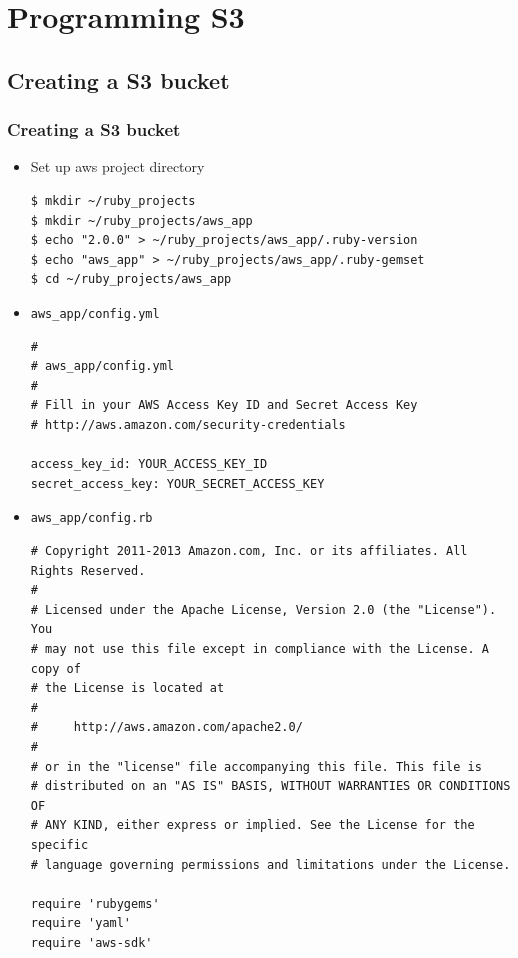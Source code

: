 \documentclass{beamer}
\begin{document}
\section{Programming S3}
\subsection{Creating a S3 bucket}
\begin{frame}
\frametitle{Creating a S3 bucket}
\begin{itemize}

\item Set up aws project directory
\lstset{language=shell, escapechar=!}
\begin{lstlisting}[escapechar=!]
$ mkdir ~/ruby_projects
$ mkdir ~/ruby_projects/aws_app
$ echo "2.0.0" > ~/ruby_projects/aws_app/.ruby-version
$ echo "aws_app" > ~/ruby_projects/aws_app/.ruby-gemset
$ cd ~/ruby_projects/aws_app
\end{lstlisting}

\item \texttt{aws\_app/config.yml}
\lstset{language=shell, escapechar=!}
\begin{lstlisting}[escapechar=!]
#
# aws_app/config.yml
#
# Fill in your AWS Access Key ID and Secret Access Key
# http://aws.amazon.com/security-credentials
               
access_key_id: YOUR_ACCESS_KEY_ID
secret_access_key: YOUR_SECRET_ACCESS_KEY
\end{lstlisting}

\item \texttt{aws\_app/config.rb}
\lstset{language=Ruby, style=eclipse}
\begin{lstlisting}[escapechar=$]
# Copyright 2011-2013 Amazon.com, Inc. or its affiliates. All Rights Reserved.
#
# Licensed under the Apache License, Version 2.0 (the "License"). You
# may not use this file except in compliance with the License. A copy of
# the License is located at
#
#     http://aws.amazon.com/apache2.0/
#
# or in the "license" file accompanying this file. This file is
# distributed on an "AS IS" BASIS, WITHOUT WARRANTIES OR CONDITIONS OF
# ANY KIND, either express or implied. See the License for the specific
# language governing permissions and limitations under the License.

require 'rubygems'
require 'yaml'
require 'aws-sdk'


\end{lstlisting}
\end{itemize}
\end{frame}
\end{document}
